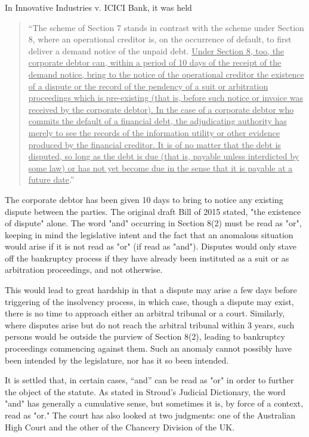 \documentclass[12pt]{article}
\begin{document}
\noindent In Innovative Industries v. ICICI Bank, it was held

\begin{quote}
  ``The scheme of Section 7 stands in contrast with the scheme under Section 8, where an operational creditor is, on the occurrence of default, to first deliver a demand notice of the unpaid debt. \uline{Under Section 8, too, the corporate debtor can, within a period of 10 days of the receipt of the demand notice, bring to the notice of the operational creditor the existence of a dispute or the record of the pendency of a suit or arbitration proceedings which is pre-existing (that is, before such notice or invoice was received by the corporate debtor). In the case of a corporate debtor who commits the default of a financial debt, the adjudicating authority has merely to see the records of the information utility or other evidence produced by the financial creditor. It is of no matter that the debt is disputed, so long as the debt is due (that is, payable unless interdicted by some law) or has not yet become due in the sense that it is payable at a future date}.''
\end{quote}

\noindent The corporate debtor has been given 10 days to bring to notice any existing dispute between the parties. The original draft Bill of 2015 stated, "the existence of dispute" alone. The word "and" occurring in Section 8(2) must be read as "or", keeping in mind the legislative intent and the fact that an anomalous situation would arise if it is not read as "or" (if read as "and"). Disputes would only stave off the bankruptcy process if they have already been instituted as a suit or as arbitration proceedings, and not otherwise.

This would lead to great hardship in that a dispute may arise a few days before triggering of the insolvency process, in which case, though a dispute may exist, there is no time to approach either an arbitral tribunal or a court. Similarly, where disputes arise but do not reach the arbitral tribunal within 3 years, such persons would be outside the purview of Section 8(2), leading to bankruptcy proceedings commencing against them. Such an anomaly cannot possibly have been intended by the legislature, nor has it so been intended.  

It is settled that, in certain cases, ``and'' can be read as "or" in order to further the object of the statute. As stated in Stroud's Judicial Dictionary, the word "and" has generally a cumulative sense, but sometimes it is, by force of a context, read as "or."
The court has also looked at two judgments: one of the Australian High Court and the other of the Chancery Division of the UK.
\end{document}
